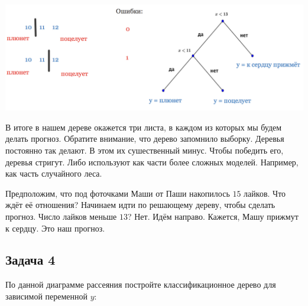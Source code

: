 \documentclass[12pt, a4paper, oneside]{article}
\begin{document}
{	\begin{center}
	\includegraphics[scale=0.28]{class_tree_2.png}
\end{center} 	
	
В итоге в нашем дереве окажется три листа, в каждом из которых мы будем делать прогноз. Обратите внимание, что дерево запомнило выборку.  Деревья постоянно так делают. В этом их сушественный минус. Чтобы победить его, деревья стригут. Либо используют как части более сложных моделей. Например, как часть случайного леса. 

Предположим, что под фоточками Маши от Паши накопилось $15$ лайков. Что ждёт её отношения? Начинаем идти по решающему дереву, чтобы сделать прогноз. Число лайков меньше $13$? Нет. Идём направо. Кажется, Машу прижмут к сердцу. Это наш прогноз.  	
}


\subsection*{Задача 4}

По данной диаграмме рассеяния постройте классификационное дерево для зависимой переменной $y$:

	\begin{center}
		\begin{tikzpicture}[scale = 0.015]
		
		\end{tikzpicture}
	\end{center}
\end{document}

